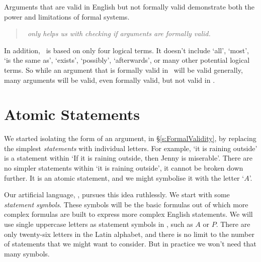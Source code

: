 \documentclass[PHIL101-Textbook.tex]{subfiles}
\begin{document}
Arguments that are valid in English but not formally valid demonstrate both the power and limitations of formal systems.
\begin{quote}
\emph{\tfl\ only helps us with checking if arguments are formally valid.}
\end{quote}
In addition, \tfl\ is based on only four logical terms. It doesn't include `all', `most', `is the same as', `exists', `possibly', `afterwards', or many other potential logical terms. So while an argument that is formally valid in \tfl\ will be valid generally, many arguments will be valid, even formally valid, but not valid in \tfl. 


\section{Atomic Statements}

We started isolating the form of an argument, in \S\ref{s:FormalValidity}, by replacing the simplest \emph{statements} with individual letters. For example, `it is raining outside' is a statement within `If it is raining outside, then Jenny is miserable'. There are no simpler statements within  `it is raining outside', it cannot be broken down further. It is an atomic statement, and we might symbolise it with the letter `$A$'.

Our artificial language, \tfl, pursues this idea ruthlessly. We start with some \emph{statement symbols}. These symbols will be the basic formulas out of which more complex formulas are built to express more complex English statements. We will use single uppercase letters as statement symbols in \tfl, such as $A$ or $P$. There are only twenty-six letters in the Latin alphabet, and there is no limit to the number of statements that we might want to consider. But in practice we won't need that many symbols. 
\end{document}
